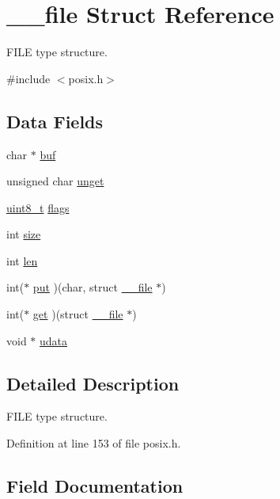 \hypertarget{struct____file}{}\section{\+\_\+\+\_\+file Struct Reference}
\label{struct____file}


F\+I\+LE type structure.  




{\ttfamily \#include $<$posix.\+h$>$}

\subsection*{Data Fields}
\begin{DoxyCompactItemize}
\item 
char $\ast$ \hyperlink{struct____file_a3e5a85ae919a90efbb7cb44ccb54fe46}{buf}
\item 
unsigned char \hyperlink{struct____file_a1d139ae3cb11a1fada469a49f7d3d3b6}{unget}
\item 
\hyperlink{send_8c_aba7bc1797add20fe3efdf37ced1182c5}{uint8\+\_\+t} \hyperlink{struct____file_a8d11df8679502efee09740f97d7c277b}{flags}
\item 
int \hyperlink{struct____file_aff4a1ca8b6a12460812928afae81248d}{size}
\item 
int \hyperlink{struct____file_a30309efd13a75ed510bb2370debafaf8}{len}
\item 
int($\ast$ \hyperlink{struct____file_a01c8b217e42cc11b6a7f8429114e9d46}{put} )(char, struct \hyperlink{struct____file}{\+\_\+\+\_\+file} $\ast$)
\item 
int($\ast$ \hyperlink{struct____file_a2d816b077c3af0425344fe4b283dad33}{get} )(struct \hyperlink{struct____file}{\+\_\+\+\_\+file} $\ast$)
\item 
void $\ast$ \hyperlink{struct____file_abe6f3bdb4df4119277132eb3e13a4628}{udata}
\end{DoxyCompactItemize}


\subsection{Detailed Description}
F\+I\+LE type structure. 

Definition at line 153 of file posix.\+h.



\subsection{Field Documentation}
